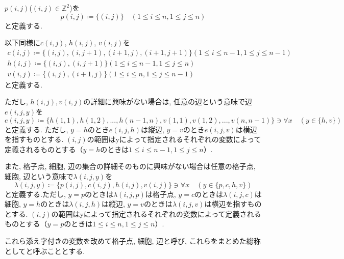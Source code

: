 \begin{definition}[格子点$p(i,j)$, 細胞$c(i,j)$, 横辺$h(i,j)$, 縦辺$v(i,j)$]\label{definition:VariableAtBoard}
  $p(i,j)$($(i,j)\in \mathbb{Z}^2$)を
  \begin{equation*}
    p(i,j)\coloneqq \{(i,j)\} \quad (1\leq i \leq n, 1\leq j \leq n)
  \end{equation*}
  と定義する.

  以下同様に$c(i,j)$, $h(i,j)$, $v(i,j)$を
  \begin{gather*}
    c(i,j)\coloneqq  \{(i,j), (i,j+1), (i+1,j), (i+1,j+1)\}  (1\leq i \leq n-1, 1\leq j \leq n-1)  \\
    h(i,j)\coloneqq  \{(i,j), (i,j+1)\}                      (1\leq i \leq n-1, 1\leq j \leq n)    \\
    v(i,j)\coloneqq  \{(i,j), (i+1,j)\}                      (1\leq i \leq n, 1\leq j \leq n-1)
  \end{gather*}
  と定義する.

  ただし, $h(i,j),v(i,j)$の詳細に興味がない場合は, 任意の辺という意味で辺$e(i,j,y)$を
  \begin{equation*}
    e(i,j,y) \coloneqq \{h(1,1),h(1,2),...,h(n-1,n),v(1,1),v(1,2),...,v(n,n-1)\}\ni \forall x \quad (y \in \{h,v\})
  \end{equation*}
  と定義する.
  ただし, $y=h$のとき$e(i,j,h)$は縦辺, $y=v$のとき$e(i,j,v)$は横辺を指すものとする. $(i,j)$の範囲はyによって指定されるそれぞれの変数によって定義されるものとする（$y=h$のときは$1\leq i \leq n-1,1\leq j \leq n$）.

  また, 格子点, 細胞, 辺の集合の詳細そのものに興味がない場合は任意の格子点, 細胞, 辺という意味で$\lambda(i,j,y)$を
  \begin{equation*}
    \lambda(i,j,y) \coloneqq \{p(i,j),c(i,j),h(i,j),v(i,j)\}\ni \forall x \quad (y \in \{p,c,h,v\})
  \end{equation*}
  と定義する.ただし, $y=p$のときは$\lambda(i,j,p)$は格子点, $y=c$のときは$\lambda(i,j,c)$は細胞, $y=h$のときは$\lambda(i,j,h)$は縦辺, $y=v$のときは$\lambda(i,j,v)$は横辺を指すものとする. $(i,j)$の範囲はyによって指定されるそれぞれの変数によって定義されるものとする（$y=p$のときは$1\leq i \leq n,1\leq j \leq n$）.
\end{definition}
これら添え字付きの変数を改めて格子点, 細胞, 辺と呼び, これらをまとめた総称としてと呼ぶこととする.

